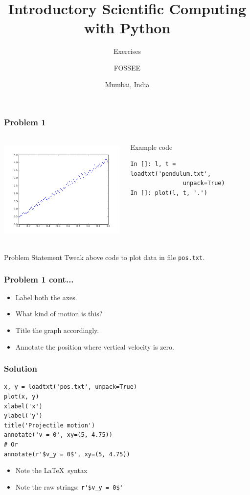 \documentclass[14pt,compress]{beamer}
\title[Exercises]{Introductory Scientific Computing with Python}
\subtitle{Exercises}
\author[FOSSEE] {FOSSEE}
\institute[FOSSEE -- IIT Bombay] {Department of Aerospace Engineering\\IIT Bombay}
\date[] {Mumbai, India}
\newcommand{\typ}[1]{\lstinline{#1}}
\begin{document}
\begin{frame}
  \titlepage
\end{frame}


\begin{frame}[fragile]
  \frametitle{Problem 1}
  \begin{columns}
    \hspace*{-0.5in}
    \includegraphics[height=2in, interpolate=true]{data/L-Tsq.png}
    \begin{block}{Example code}
      \tiny
\begin{lstlisting}
In []: l, t = loadtxt('pendulum.txt',
               unpack=True)
In []: plot(l, t, '.')
    \end{lstlisting}
    \end{block}
  \end{columns}
  \begin{block}{Problem Statement}
      Tweak above code to plot data in file \typ{pos.txt}.
  \end{block}
\end{frame}

\begin{frame}
  \frametitle{Problem 1 cont...}
  \begin{itemize}
  \item Label both the axes.
  \item What kind of motion is this?
  \item Title the graph accordingly.
  \item Annotate the position where vertical velocity is zero.
  \end{itemize}
\end{frame}

\begin{frame}[fragile]
  \frametitle{Solution}
\begin{lstlisting}
x, y = loadtxt('pos.txt', unpack=True)
plot(x, y)
xlabel('x')
ylabel('y')
title('Projectile motion')
annotate('v = 0', xy=(5, 4.75))
# Or
annotate(r'$v_y = 0$', xy=(5, 4.75))
\end{lstlisting}
  \begin{itemize}
  \item Note the \LaTeX\ syntax
  \item Note the raw strings: \typ{r'$v_y = 0$'}
  \end{itemize}
\end{frame}
\end{document}
